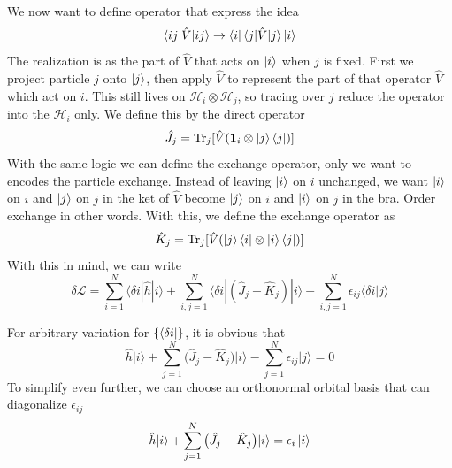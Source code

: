 \documentclass[../../../main.tex]{subfiles}
\begin{document}
We now want to define operator that express the idea
\begin{equation*}
  \braket{ij  | \hat{V}|ij} \to \bra{i } \braket{j  | \hat{V}|j }\ket{i}
\end{equation*}
The realization is as the part of $\hat{V}$ that acts on $\ket{i}$ when $j$ is fixed.
First we project particle $j$ onto $\ket{j}$, then apply $\hat{V}$ to represent the part of that operator $\hat{V}$ which act on $i$.
This still lives on $\mathcal{H}_i \otimes \mathcal{H}_j$, so tracing over $j$ reduce the operator into the $\mathcal{H}_i$ only.
We define this by the direct operator
\begin{equation*}
  \hat{J }_j = \mathrm{Tr}_j[\hat{V}(\mathbf{1 }_i \otimes \ket{j}\bra{j})]
\end{equation*}
With the same logic we can define the exchange operator, only we want to encodes the particle exchange.
Instead of leaving $\ket{i}$ on $i$ unchanged, we want $\ket{i}$ on $i$ and $\ket{j}$ on $j$ in the ket of $\hat{V}$ become $\ket{j}$ on $i$ and $\ket{i}$ on $j$ in the bra.
Order exchange in other words.
With this, we define the exchange operator as
\begin{equation*}
  \hat{K }_j = \mathrm{Tr}_j[\hat{V}(\ket{j} \bra{i} \otimes \ket{i}\bra{j})]
\end{equation*}
With this in mind, we can write
\begin{equation*}
  \delta\mathcal{L }
  = \sum_{i=1}^{N}\langle\delta i|\hat{h}|i\rangle
  + \sum_{i,j=1}^{N} \langle \delta i| (\hat{J}_j-\hat{K }_j)|i\rangle
  + \sum_{i,j=1}^{N}\epsilon_{ij}\langle \delta i| j\rangle
\end{equation*}

For arbitrary variation for $\left\{ \bra{\delta i} \right\} $, it is obvious that
\begin{equation*}
  \hat{h}\lvert i\rangle + \sum_{j=1}^{N}\big(\hat{J}_j - \hat{K}_j\big)\lvert i\rangle - \sum_{j=1}^{N}\epsilon_{ij}\lvert j\rangle =0
\end{equation*}
To simplify even further, we can choose an orthonormal orbital basis that can diagonalize $\epsilon_{ij}$
\begin{equation*}
  \hat{h}\lvert i\rangle + \sum_{j=1}^{N}\big(\hat{J}_j - \hat{K}_j\big)\lvert i\rangle = \epsilon_i \ket{i}
\end{equation*}
\end{document}
